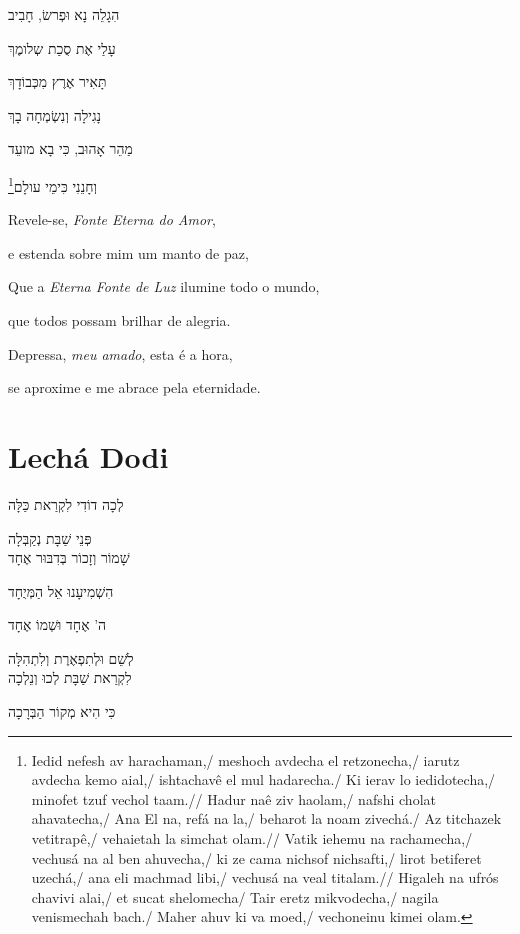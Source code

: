 הִגָלֵה נָא וּפְרשׂ, חָבִיב

עָלַי אֶת סֻכַת שְלומֶךְ

תָּאִיר אֶרֶץ מִכְּבוֹדָךְ

נָגִילָה וְנִשְׂמְחָה בָךְ

מַהֵר אָהוּב, כִּי בָא מועֵד

וְחָנֵנִי כִּימֵי עולָם\footnote{
Iedid nefesh av harachaman,/ meshoch avdecha el retzonecha,/ iarutz avdecha kemo aial,/
ishtachavê el mul hadarecha./ Ki ierav lo iedidotecha,/ minofet tzuf vechol taam.//
Hadur naê ziv haolam,/ nafshi cholat ahavatecha,/ Ana El na, refá na la,/ beharot la noam zivechá./ Az titchazek vetitrapê,/ vehaietah la simchat olam.// Vatik iehemu na rachamecha,/
vechusá na al ben ahuvecha,/ ki ze cama nichsof nichsafti,/ lirot betiferet uzechá,/
ana eli machmad libi,/ vechusá na veal titalam.// Higaleh na ufrós chavivi alai,/
et sucat shelomecha/ Tair eretz mikvodecha,/ nagila venismechah bach./ Maher ahuv ki va moed,/
vechoneinu kimei olam.}

\movetooddpage
\raggedright


Revele-se, \emph{Fonte Eterna do Amor},

e estenda sobre mim um manto de paz,

Que a \emph{Eterna Fonte de Luz} ilumine todo o mundo,

que todos possam brilhar de alegria.

Depressa, \emph{meu amado}, esta é a hora,

se aproxime e me abrace pela eternidade.

\movetoevenpage
\raggedleft


\section{Lechá Dodi}

לְכָה דוֹדִי לִקְרַאת כַּלָּה

פְּנֵי שַׁבָּת נְקַבְּלָה\\[10pt]

שָׁמוֹר וְזָכוֹר בְּדִבּוּר אֶחָד

הִשְׁמִיעָנוּ אֵל הַמְּיֻחָד

ה' אֶחָד וּשְׁמוֹ אֶחָד

לְשֵׁם וּלְתִפְאֶרֶת וְלִתְהִלָּה\\[10pt]

לִקְרַאת שַׁבָּת לְכוּ וְנֵלְכָה

כִּי הִיא מְקוֹר הַבְּרָכָה

